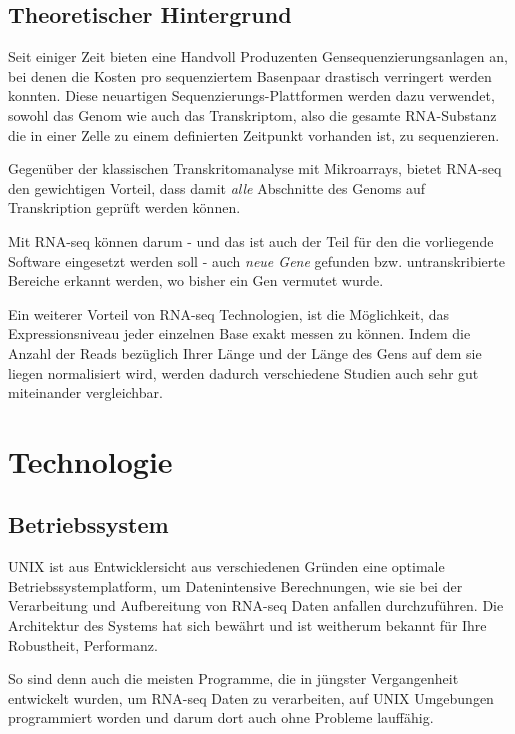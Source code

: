 \documentclass[a4paper]{thesis}
\begin{document}
\subsection{Theoretischer Hintergrund}
Seit einiger Zeit bieten eine Handvoll Produzenten Gensequenzierungsanlagen an,
bei denen die Kosten pro sequenziertem Basenpaar
drastisch verringert werden konnten. Diese neuartigen
Sequenzierungs-Plattformen werden dazu verwendet, sowohl
das Genom wie auch das Transkriptom, also die gesamte RNA-Substanz die
in einer Zelle zu einem definierten Zeitpunkt vorhanden ist, zu sequenzieren.

Gegenüber der klassischen Transkritomanalyse mit Mikroarrays, bietet RNA-seq
den gewichtigen Vorteil, dass damit {\em alle} Abschnitte des Genoms
auf Transkription geprüft werden können.

Mit RNA-seq können darum - und das ist auch der Teil für den die vorliegende
Software eingesetzt werden soll - auch {\em neue Gene} gefunden bzw.
untranskribierte Bereiche erkannt werden,
wo bisher ein Gen vermutet wurde.
\cite{croucher_studying_2010}

Ein weiterer Vorteil von RNA-seq Technologien, ist die Möglichkeit,
das Expressionsniveau jeder einzelnen Base exakt messen zu können.
Indem die Anzahl der Reads bezüglich Ihrer Länge und der Länge des
Gens auf dem sie liegen normalisiert wird, werden
dadurch verschiedene Studien auch sehr gut miteinander vergleichbar.
\cite{croucher_studying_2010,wang_rna-seq:_2009}

\section{Technologie}

\subsection{Betriebssystem}

UNIX ist aus Entwicklersicht aus verschiedenen Gründen eine optimale
Betriebssystemplatform, um Datenintensive Berechnungen, wie sie bei
der Verarbeitung und Aufbereitung von RNA-seq Daten anfallen durchzuführen.
Die Architektur des Systems hat sich bewährt und ist weitherum bekannt
für Ihre Robustheit, Performanz.

So sind denn auch die meisten Programme, die in jüngster Vergangenheit
entwickelt wurden, um RNA-seq Daten zu verarbeiten, auf UNIX Umgebungen
programmiert worden und darum dort auch ohne Probleme lauffähig.
\end{document}

